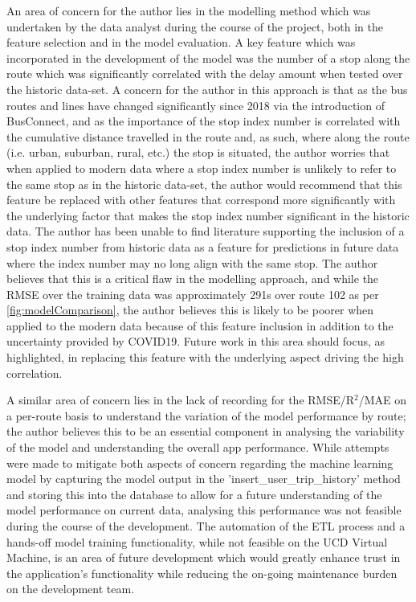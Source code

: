 \documentclass[]{UCD_CS_47360_Report}
\begin{document}
An area of concern for the author lies in the modelling method which was undertaken by the data analyst during the course of the project, both in the feature selection and in the model evaluation. A key feature which was incorporated in the development of the model was the number of a stop along the route which was significantly correlated with the delay amount when tested over the historic data-set. A concern for the author in this approach is that as the bus routes and lines have changed significantly since 2018 via the introduction of BusConnect, and as the importance of the stop index number is correlated with the cumulative distance travelled in the route and, as such, where along the route (i.e. urban, suburban, rural, etc.) the stop is situated, the author worries that when applied to modern data where a stop index number is unlikely to refer to the same stop as in the historic data-set, the author would recommend that this feature be replaced with other features that correspond more significantly with the underlying factor that makes the stop index number significant in the historic data. The author has been unable to find literature supporting the inclusion of a stop index number from historic data as a feature for predictions in future data where the index number may no long align with the same stop. The author believes that this is a critical flaw in the modelling approach, and while the RMSE over the training data was approximately 291s over route 102 as per \ref{fig:modelComparison}, the author believes this is likely to be poorer when applied to the modern data because of this feature inclusion in addition to the uncertainty provided by COVID19. Future work in this area should focus, as highlighted, in replacing this feature with the underlying aspect driving the high correlation.

A similar area of concern lies in the lack of recording for the RMSE/R$^{2}$/MAE on a per-route basis to understand the variation of the model performance by route; the author believes this to be an essential component in analysing the variability of the model and understanding the overall app performance. While attempts were made to mitigate both aspects of concern regarding the machine learning model by capturing the model output in the 'insert\_user\_trip\_history' method and storing this into the database to allow for a future understanding of the model performance on current data, analysing this performance was not feasible during the course of the development. The automation of the ETL process and a hands-off model training functionality, while not feasible on the UCD Virtual Machine, is an area of future development which would greatly enhance trust in the application's functionality while reducing the on-going maintenance burden on the development team.
\end{document}
